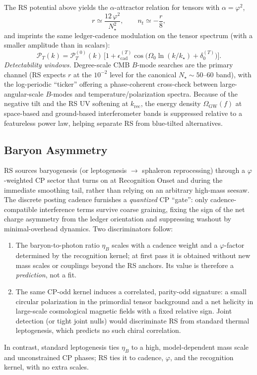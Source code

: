 \documentclass[11pt]{article}
\theoremstyle{definition}
\theoremstyle{remark}
\begin{document}
The RS potential above yields the \(\alpha\)-attractor relation for tensors with \(\alpha=\varphi^2\),
\begin{equation}
\label{eq:tensors}
r \simeq \frac{12\,\varphi^2}{N_\star^2},\qquad n_t \simeq -\frac{r}{8},
\end{equation}
and imprints the same ledger-cadence modulation on the tensor spectrum (with a smaller amplitude than in scalars):
\[
\mathcal P_T(k)=\mathcal P_T^{(0)}(k)\,\Big[1+\epsilon^{(T)}_{\mathrm{cad}}\cos\!\big(\Omega_0\ln(k/k_\star)+\delta^{(T)}_0\big)\Big].
\]
\emph{Detectability windows.} Degree-scale CMB \(B\)-mode searches are the primary channel (RS expects \(r\) at the \(10^{-2}\) level for the canonical \(N_\star\sim 50\text{--}60\) band), with the log-periodic “ticker” offering a phase-coherent cross-check between large-angular-scale \(B\)-modes and temperature/polarization spectra. Because of the negative tilt and the RS UV softening at \(k_{\mathrm{rec}}\), the energy density \(\Omega_{\mathrm{GW}}(f)\) at space-based and ground-based interferometer bands is suppressed relative to a featureless power law, helping separate RS from blue-tilted alternatives.

\subsection{Baryon Asymmetry}

RS sources baryogenesis (or leptogenesis \(\rightarrow\) sphaleron reprocessing) through a \(\varphi\)-weighted CP sector that turns on at Recognition Onset and during the immediate smoothing tail, rather than relying on an arbitrary high-mass seesaw. The discrete posting cadence furnishes a \emph{quantized} CP “gate”: only cadence-compatible interference terms survive coarse graining, fixing the sign of the net charge asymmetry from the ledger orientation and suppressing washout by minimal-overhead dynamics. Two discriminators follow:
\begin{enumerate}
  \item The baryon-to-photon ratio \(\eta_B\) scales with a cadence weight and a \(\varphi\)-factor determined by the recognition kernel; at first pass it is obtained without new mass scales or couplings beyond the RS anchors. Its value is therefore a \emph{prediction}, not a fit.
  \item The same CP-odd kernel induces a correlated, parity-odd signature: a small circular polarization in the primordial tensor background and a net helicity in large-scale cosmological magnetic fields with a fixed relative sign. Joint detection (or tight joint nulls) would discriminate RS from standard thermal leptogenesis, which predicts no such chiral correlation.
\end{enumerate}
In contrast, standard leptogenesis ties \(\eta_B\) to a high, model-dependent mass scale and unconstrained CP phases; RS ties it to cadence, \(\varphi\), and the recognition kernel, with no extra scales.
\end{document}
